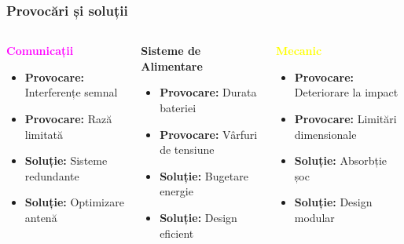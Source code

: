 
\begin{frame}
\frametitle{Provocări și soluții}
\begin{columns}[T]
    \begin{column}{0.3\textwidth}
    \textbf{\textcolor{magenta}{Comunicații}}
    \small
    \begin{itemize}
        \item \textbf{Provocare:} Interferențe semnal
        \item \textbf{Provocare:} Rază limitată
        \item \textbf{Soluție:} Sisteme redundante
        \item \textbf{Soluție:} Optimizare antenă
    \end{itemize}
    \end{column}
    
    \begin{column}{0.3\textwidth}
    \textbf{\textcolor{mainblue}{Sisteme de Alimentare}}
    \small
    \begin{itemize}
        \item \textbf{Provocare:} Durata bateriei
        \item \textbf{Provocare:} Vârfuri de tensiune
        \item \textbf{Soluție:} Bugetare energie
        \item \textbf{Soluție:} Design eficient
    \end{itemize}
    \end{column}
    
    \begin{column}{0.3\textwidth}
    \textbf{\textcolor{yellow}{Mecanic}}
    \small
    \begin{itemize}
        \item \textbf{Provocare:} Deteriorare la impact
        \item \textbf{Provocare:} Limitări dimensionale
        \item \textbf{Soluție:} Absorbție șoc
        \item \textbf{Soluție:} Design modular
    \end{itemize}
    \end{column}
\end{columns}


\end{frame}
